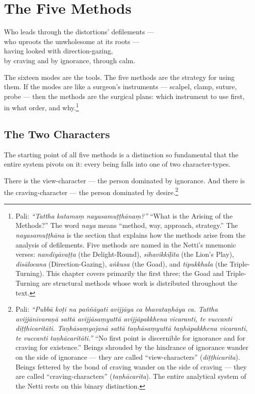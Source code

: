 \chapter{The Five Methods}
\label{ch:five-methods}

\begin{versebox}
Who leads through the distortions' defilements ---\\
who uproots the unwholesome at its roots ---\\
having looked with direction-gazing,\\
by craving and by ignorance, through calm.
\end{versebox}

\noindent The sixteen modes are the tools. The five methods are the strategy for using them. If the modes are like a surgeon's instruments --- scalpel, clamp, suture, probe --- then the methods are the surgical plans: which instrument to use first, in what order, and why.\footnote{Pali: \textit{``Tattha katamaṃ nayasamuṭṭhānaṃ?''} ``What is the Arising of the Methods?'' The word \textit{naya} means ``method, way, approach, strategy.'' The \textit{nayasamuṭṭhāna} is the section that explains how the methods arise from the analysis of defilements. Five methods are named in the Netti's mnemonic verses: \textit{nandiyāvaṭṭa} (the Delight-Round), \textit{sīhavikkīḷita} (the Lion's Play), \textit{disālocana} (Direction-Gazing), \textit{aṅkusa} (the Goad), and \textit{tipukkhala} (the Triple-Turning). This chapter covers primarily the first three; the Goad and Triple-Turning are structural methods whose work is distributed throughout the text.}

\section*{The Two Characters}

The starting point of all five methods is a distinction so fundamental that the entire system pivots on it: every being falls into one of two character-types.

There is the view-character --- the person dominated by ignorance. And there is the craving-character --- the person dominated by desire.\footnote{Pali: \textit{``Pubbā koṭi na paññāyati avijjāya ca bhavataṇhāya ca. Tattha avijjānīvaraṇā sattā avijjāsaṃyuttā avijjāpakkhena vicaranti, te vuccanti diṭṭhicaritāti. Taṇhāsaṃyojanā sattā taṇhāsaṃyuttā taṇhāpakkhena vicaranti, te vuccanti taṇhācaritāti.''} ``No first point is discernible for ignorance and for craving for existence.'' Beings shrouded by the hindrance of ignorance wander on the side of ignorance --- they are called ``view-characters'' (\textit{diṭṭhicarita}). Beings fettered by the bond of craving wander on the side of craving --- they are called ``craving-characters'' (\textit{taṇhācarita}). The entire analytical system of the Netti rests on this binary distinction.}

